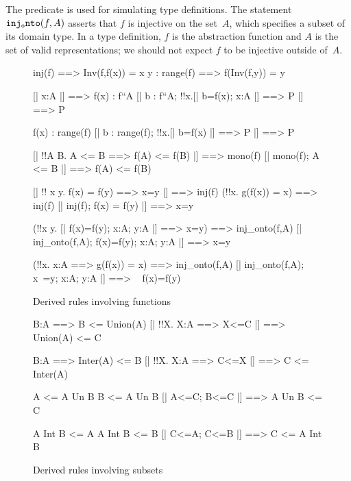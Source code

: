 The predicate  is used for simulating type definitions.
The statement ${\tt inj_onto}(f,A)$ asserts that $f$ is injective on the
set~$A$, which specifies a subset of its domain type.  In a type
definition, $f$ is the abstraction function and $A$ is the set of valid
representations; we should not expect $f$ to be injective outside of~$A$.

\begin{figure} \underscoreon
\begin{ttbox}
    inj(f) ==> Inv(f,f(x)) = x
    y : range(f) ==> f(Inv(f,y)) = y

%
     [| x:A |] ==> f(x) : f``A
     [| b : f``A;  !!x.[| b=f(x);  x:A |] ==> P |] ==> P

     f(x) : range(f)
     [| b : range(f);  !!x.[| b=f(x) |] ==> P |] ==> P

      [| !!A B. A <= B ==> f(A) <= f(B) |] ==> mono(f)
      [| mono(f);  A <= B |] ==> f(A) <= f(B)

       [| !! x y. f(x) = f(y) ==> x=y |] ==> inj(f)
              (!!x. g(f(x)) = x) ==> inj(f)
       [| inj(f); f(x) = f(y) |] ==> x=y

  (!!x y. [| f(x)=f(y); x:A; y:A |] ==> x=y) ==> inj_onto(f,A)
  [| inj_onto(f,A);  f(x)=f(y);  x:A;  y:A |] ==> x=y

    (!!x. x:A ==> g(f(x)) = x) ==> inj_onto(f,A)
    [| inj_onto(f,A);  x~=y;  x:A;  y:A |] ==> ~ f(x)=f(y)
\end{ttbox}
\caption{Derived rules involving functions} \label{hol-fun}
\end{figure}


\begin{figure} \underscoreon
\begin{ttbox}
     B:A ==> B <= Union(A)
     [| !!X. X:A ==> X<=C |] ==> Union(A) <= C

     B:A ==> Inter(A) <= B
  [| !!X. X:A ==> C<=X |] ==> C <= Inter(A)

       A <= A Un B
       B <= A Un B
        [| A<=C;  B<=C |] ==> A Un B <= C

      A Int B <= A
      A Int B <= B
    [| C<=A;  C<=B |] ==> C <= A Int B
\end{ttbox}
\caption{Derived rules involving subsets} \label{hol-subset}
\end{figure}


